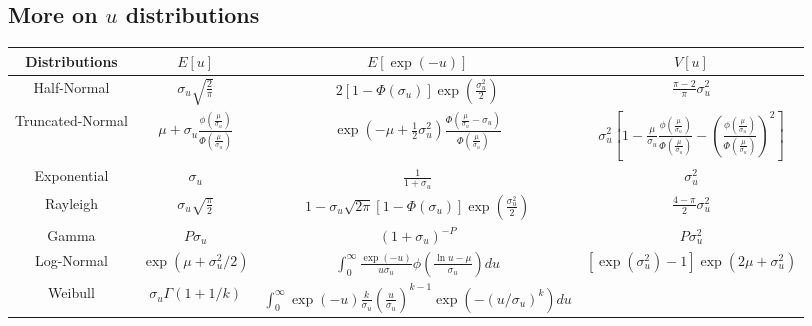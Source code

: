 \documentclass[nojss]{jss}
\begin{document}
\begin{appendix}

\section{More on $u$ distributions}\label{app:moredens}

\setcounter{table}{0}
\renewcommand{\thetable}{\Alph{section}\arabic{table}}

\begin{table}[h]
\renewcommand{\arraystretch}{1.3}
\centering
\begin{adjustbox}{max width=1\textwidth}
\begin{tabular}{@{}cccc@{}}
\toprule
Distributions & $E\left[u\right]$ & $E\left[\exp{\left(-u\right)}\right]$ & $V\left[u\right]$ \\
\midrule
Half-Normal & $\sigma_u\sqrt{\frac{2}{\pi}}$ & $2\left[1-\Phi\left(\sigma_u\right)\right]\exp{\left(\frac{\sigma_u^2}{2}\right)}$ & 
$\frac{\pi-2}{\pi}\sigma_u^2$ \\[1em]
Truncated-Normal & $\mu + \sigma_u\frac{\phi\left(\frac{\mu}{\sigma_u}\right)}{\Phi\left(\frac{\mu}{\sigma_u}\right)}$ & 
$\exp{\left(-\mu + \frac{1}{2}\sigma_u^2\right)}\frac{\Phi\left(\frac{\mu}{\sigma_u} - \sigma_u\right)}{\Phi\left(\frac{\mu}{\sigma_u}\right)}$ & 
$\sigma_u^2\left[1 - \frac{\mu}{\sigma_u} \frac{\phi\left(\frac{\mu}{\sigma_u}\right)}{\Phi\left(\frac{\mu}{\sigma_u}\right)} - \left(\frac{\phi\left(\frac{\mu}{\sigma_u}\right)}{\Phi\left(\frac{\mu}{\sigma_u}\right)}\right)^2\right]$\\[1em]
Exponential & $\sigma_u$ & $\frac{1}{1+\sigma_u}$ & $\sigma_u^2$\\[1em]
Rayleigh & $\sigma_u\sqrt{\frac{\pi}{2}}$ & $1 - \sigma_u\sqrt{2\pi}\left[1-\Phi\left(\sigma_u\right)\right]\exp{\left(\frac{\sigma_u^2}{2}\right)}$ &
$\frac{4-\pi}{2}\sigma_u^2$\\[1em]
Gamma & $P\sigma_u$ & $\left(1+\sigma_u\right)^{-P}$ & $P\sigma_u^2$\\[1em]
Log-Normal & $\exp{\left(\mu +\sigma_u^2/2\right)}$ & $\int_0^\infty \frac{\exp{\left(-u\right)}}{u\sigma_u}\phi\left(\frac{\ln{u}-\mu}{\sigma_u}\right)du$ & 
$\left[\exp{\left(\sigma_u^2\right)}-1\right]\exp{\left(2\mu +\sigma_u^2\right)}$\\[1em]
Weibull & $\sigma_u\Gamma\left(1+1/k\right)$ & 
$\int_0^\infty\exp{\left(-u\right)}\frac{k}{\sigma_u}\left(\frac{u}{\sigma_u}\right)^{k-1}\exp{\left(-\left(u/\sigma_u\right)^{k}\right)}du$ & 

\end{tabular}
\end{adjustbox}
\end{table}
\end{appendix}
\end{document}
